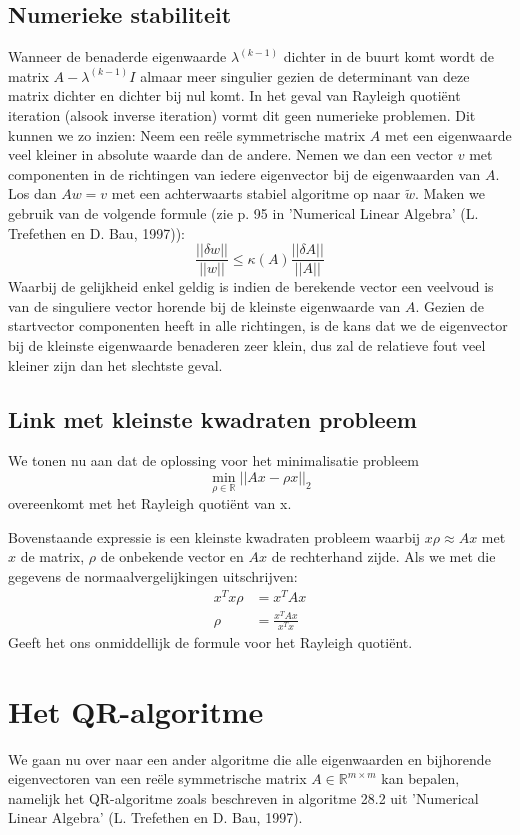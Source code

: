 \documentclass[a4paper]{article}
\begin{document}
\subsection{Numerieke stabiliteit}	
	Wanneer de benaderde eigenwaarde $\lambda^{(k-1)}$ dichter in de buurt komt wordt de matrix $A-\lambda^{(k-1)}I$ almaar meer singulier gezien de determinant van deze matrix dichter en dichter bij nul komt.
	In het geval van Rayleigh quotiënt iteration (alsook inverse iteration) vormt dit geen numerieke problemen.
	Dit kunnen we zo inzien:
	Neem een reële symmetrische matrix $A$ met een eigenwaarde veel kleiner in absolute waarde dan de andere.
	Nemen we dan een vector $v$ met componenten in de richtingen van iedere eigenvector bij de eigenwaarden van $A$.
	Los dan $Aw = v$ met een achterwaarts stabiel algoritme op naar $\tilde{w}$.
	Maken we gebruik van de volgende formule (zie p. 95 in 'Numerical Linear Algebra' (L. Trefethen en D. Bau, 1997)):
	\begin{equation}
		\frac{||\delta w||}{||w||}\leq \kappa (A)  \frac{||\delta A||}{||A||}
	\end{equation}
	Waarbij de gelijkheid enkel geldig is indien de berekende vector een veelvoud is van de singuliere vector horende bij de kleinste eigenwaarde van $A$. Gezien de startvector componenten heeft in alle richtingen, is de kans dat we de eigenvector bij de kleinste eigenwaarde benaderen zeer klein, dus zal de relatieve fout veel kleiner zijn dan het slechtste geval.
	\pagebreak
\subsection{Link met kleinste kwadraten probleem}		
	We tonen nu aan dat de oplossing voor het minimalisatie probleem
	\[ \min_{\rho \in \mathbb{R}} ||Ax - \rho x||_2 \]
	overeenkomt met het Rayleigh quotiënt van x.
	
	\vspace{5 mm}
	\noindent Bovenstaande expressie is een kleinste kwadraten probleem waarbij $x\rho \approx Ax$ met $x$ de matrix, $\rho$ de onbekende vector en $Ax$ de rechterhand zijde. Als we met die gegevens de normaalvergelijkingen uitschrijven:
	\begin{align*}
		x^Tx  \rho &= x^TAx \\
		\rho &= \frac{x^TAx}{x^Tx}
	\end{align*}
	Geeft het ons onmiddellijk de formule voor het Rayleigh quotiënt.
\section{Het QR-algoritme}
	We gaan nu over naar een ander algoritme die alle eigenwaarden en bijhorende eigenvectoren van een reële symmetrische matrix $A \in \mathbb{R}^{m \times m}$ kan bepalen, namelijk het QR-algoritme zoals beschreven in algoritme 28.2 uit 'Numerical Linear Algebra' (L. Trefethen en D. Bau, 1997).
\end{document}
